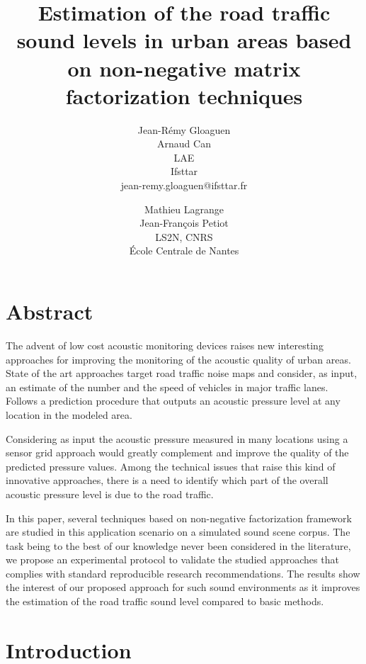 \documentclass[twocolumn,a4paper,10pt]{article}
\title{Estimation of the road traffic sound levels in urban areas based on non-negative matrix factorization techniques}
\author{
    Jean-Rémy Gloaguen\\
    Arnaud Can\\
    LAE\\
    Ifsttar\\
    jean-remy.gloaguen@ifsttar.fr
  \and
    Mathieu Lagrange\\
	Jean-François Petiot \\
    LS2N, CNRS\\
    \'Ecole Centrale de  Nantes\\
}
\date{}
\begin{document}
\maketitle

\section*{Abstract}

The advent of low cost acoustic monitoring devices raises new interesting approaches for improving the monitoring of the acoustic quality of urban areas. State of the art approaches target road traffic noise maps and consider, as input, an estimate of the number and the speed of vehicles in major traffic lanes. Follows a prediction procedure that outputs an acoustic pressure level at any location in the modeled area.

Considering as input the acoustic pressure measured in many locations using a sensor grid approach would greatly complement and improve the quality of the predicted pressure values. Among the technical issues that raise this kind of innovative approaches, there is a need to identify which part of the overall acoustic pressure level is due to the road traffic.

In this paper, several techniques based on non-negative factorization framework are studied in this application scenario on a simulated sound scene corpus. The task being to the best of our knowledge never been considered in the literature, we propose an experimental protocol to validate the studied approaches that complies with standard reproducible research recommendations. The results show the interest of our proposed approach for such sound environments as it improves the estimation of the road traffic sound level compared to basic methods.

\section{Introduction}
\end{document}
